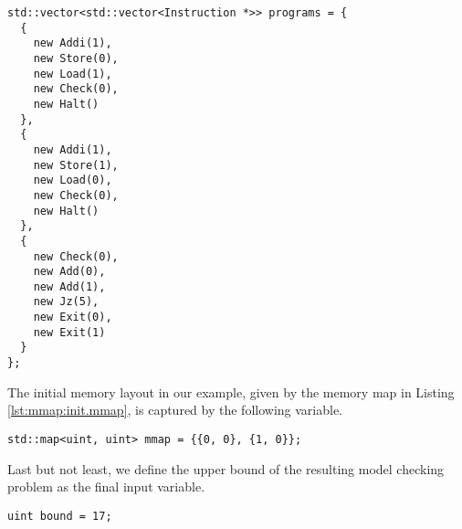 \newpage

\begin{lstlisting}[style=c++]
std::vector<std::vector<Instruction *>> programs = {
  {
    new Addi(1),
    new Store(0),
    new Load(1),
    new Check(0),
    new Halt()
  },
  {
    new Addi(1),
    new Store(1),
    new Load(0),
    new Check(0),
    new Halt()
  },
  {
    new Check(0),
    new Add(0),
    new Add(1),
    new Jz(5),
    new Exit(0),
    new Exit(1)
  }
};
\end{lstlisting}
The initial memory layout in our example, given by the memory map in Listing \ref{lst:mmap:init.mmap}, is captured by the following variable.
\begin{lstlisting}[style=c++]
std::map<uint, uint> mmap = {{0, 0}, {1, 0}};
\end{lstlisting}
Last but not least, we define the upper bound \CHANGE{$\BOUND$} of the resulting model checking problem as the final input variable.
\begin{lstlisting}[style=c++]
uint bound = 17;
\end{lstlisting}
